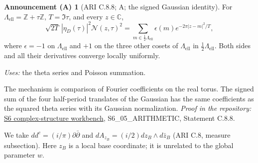 \documentclass[11pt,a4paper]{article}
\theoremstyle{plain}
\theoremstyle{definition}
\newtheorem{announcement}[theorem]{Announcement (A)}
\newcommand{\C}{\mathbb C}
\newcommand{\Z}{\mathbb Z}
\begin{document}
\begin{announcement}[ARI C.8.8; A; the signed Gaussian identity]\label{ari:C.8.8}
For $\Lambda_{\mathrm{ell}}=\Z+\tau\Z$, $T=\Im\tau$, and every $z\in\C$,
\[
 \sqrt{2T}\,|\eta_D(\tau)|^2\mathcal N(z,\tau)^2
 =\sum_{m\in\frac12\Lambda_{\mathrm{ell}}}\epsilon(m)
                         e^{-2\pi|z-m|^2/T},
\]
where $\epsilon=-1$ on $\Lambda_{\mathrm{ell}}$ and $+1$ on the three other
cosets of $\Lambda_{\mathrm{ell}}$ in $\frac12\Lambda_{\mathrm{ell}}$.
Both sides and all their derivatives converge locally uniformly.
\end{announcement}
\noindent\textit{Uses:} the theta series and Poisson summation.\par
The mechanism is comparison of Fourier coefficients on the real torus. The signed sum of the four half-period translates of the Gaussian has the same coefficients as the squared theta series with its Gaussian normalization.
\noindent\textit{Proof in the repository:} \href{https://github.com/KokunoYumeto/s6-complex-structure-workbench}{S6 complex-structure workbench}, S6\_05\_ARITHMETIC, Statement C.8.8.

We take $dd^c=(i/\pi)\partial\bar\partial$ and $dA_{z_B}=(i/2)dz_B\wedge d\bar z_B$ (ARI C.8, measure subsection). Here $z_B$ is a local base coordinate; it is unrelated to the global parameter $w$.
\end{document}
